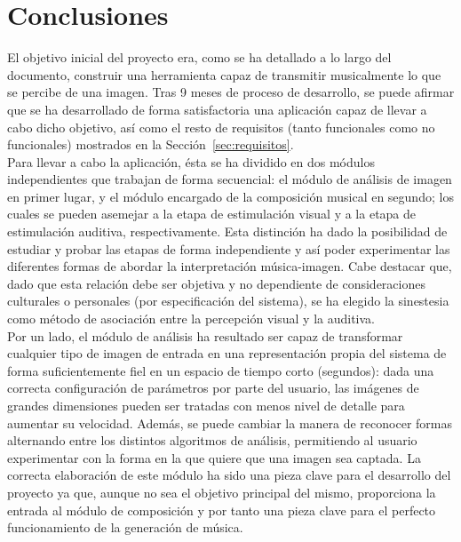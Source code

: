 \chapter{Conclusiones}
\label{chap:results}


El objetivo inicial del proyecto era, como se ha detallado a lo largo del documento, construir una herramienta capaz de transmitir musicalmente lo que se percibe de una imagen. Tras 9 meses de proceso de desarrollo, se puede afirmar que se ha desarrollado de forma satisfactoria una aplicación capaz de llevar a cabo dicho objetivo, así como el resto de requisitos (tanto funcionales como no funcionales) mostrados en la Sección~\ref{sec:requisitos}.\\



Para llevar a cabo la aplicación, ésta se ha dividido en dos módulos independientes que trabajan de forma secuencial: el módulo de análisis de imagen en primer lugar, y el módulo encargado de la composición musical en segundo; los cuales se pueden asemejar a la etapa de estimulación visual y a la etapa de estimulación auditiva, respectivamente. Esta distinción ha dado la posibilidad de estudiar y probar las etapas de forma independiente y así poder experimentar las diferentes formas de abordar la interpretación música-imagen. Cabe destacar que, dado que esta relación debe ser objetiva y no dependiente de consideraciones culturales o personales (por especificación del sistema), se ha elegido la sinestesia como método de asociación entre la percepción visual y la auditiva.\\


Por un lado, el módulo de análisis ha resultado ser capaz de transformar cualquier tipo de imagen de entrada en una representación propia del sistema de forma suficientemente fiel en un espacio de tiempo corto (segundos): dada una correcta configuración de parámetros por parte del usuario, las imágenes de grandes dimensiones pueden ser tratadas con menos nivel de detalle para aumentar su velocidad. Además, se puede cambiar la manera de reconocer formas alternando entre los distintos algoritmos de análisis, permitiendo al usuario experimentar con la forma en la que quiere que una imagen sea captada. La correcta elaboración de este módulo ha sido una pieza clave para el desarrollo del proyecto ya que, aunque no sea el objetivo principal del mismo, proporciona la entrada al módulo de composición y por tanto una pieza clave para el perfecto funcionamiento de la generación de música.\\

